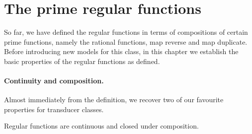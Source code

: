 \section{The prime regular functions}
\label{sec:prime-regular-functions}

So far, we have defined the regular functions in terms of compositions of certain prime functions, namely the rational functions, map reverse and map duplicate. Before introducing new models for this class, in this chapter we establish the basic properties of the regular functions as defined. 

\paragraph*{Continuity and composition.} Almost immediately from the definition, we recover two of our favourite properties for transducer classes.

\begin{theorem}\label{thm:regular-functions-are-continuous-and-closed-under-composition}
    Regular functions are continuous and closed under composition.
\end{theorem}


